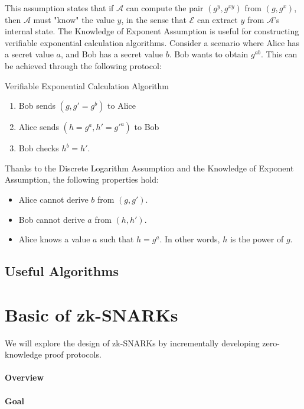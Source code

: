 \documentclass{article}
\begin{document}
This assumption states that if $\mathcal{A}$ can compute the pair $(g^y, g^{xy})$ from $(g, g^x)$, then $\mathcal{A}$ must "know" the value $y$, in the sense that $\mathcal{E}$ can extract $y$ from $\mathcal{A}$'s internal state.
The Knowledge of Exponent Assumption is useful for constructing verifiable exponential calculation algorithms. Consider a scenario where Alice has a secret value $a$, and Bob has a secret value $b$. Bob wants to obtain $g^{ab}$. This can be achieved through the following protocol:

\begin{protocol}{Verifiable Exponential Calculation Algorithm}{}
    \begin{enumerate}
    \item Bob sends $(g, g'=g^{b})$ to Alice
    \item Alice sends $(h=g^{a}, h'=g'^{a})$ to Bob
    \item Bob checks $h^{b} = h'$.
\end{enumerate}
\end{protocol}

Thanks to the Discrete Logarithm Assumption and the Knowledge of Exponent Assumption, the following properties hold:
\begin{itemize}
\item Alice cannot derive $b$ from $(g, g')$.
\item Bob cannot derive $a$ from $(h, h')$.
\item Alice knows a value $a$ such that $h = g^a$. In other words, $h$ is the power of $g$.
\end{itemize}
\subsection{Useful Algorithms}

\section{Basic of zk-SNARKs}

We will explore the design of zk-SNARKs by incrementally developing zero-knowledge proof protocols.

\paragraph{Overview}

\paragraph{Goal}
\end{document}
